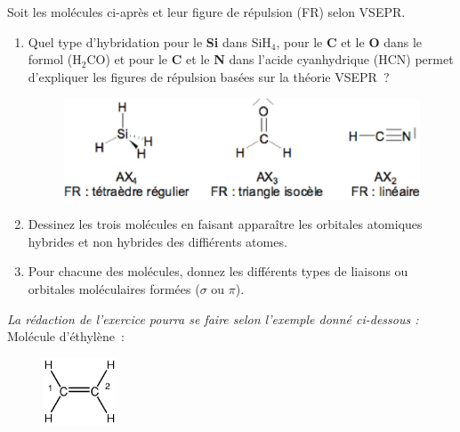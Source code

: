 

Soit les mol\'ecules ci-apr\`es et leur figure de r\'epulsion (FR) selon VSEPR.

\begin{enumerate}[\bf 1)]
\item Quel type d'hybridation pour le \textbf{Si} dans SiH$_4$, pour le \textbf{C} et le \textbf{O} dans le formol 
(H$_2$CO) et pour le \textbf{C} et le \textbf{N} dans l'acide cyanhydrique (HCN) permet d'expliquer les figures de 
r\'epulsion bas\'ees sur la th\'eorie VSEPR~?
\begin{figure}[!h]
\begin{center}
\includegraphics[scale=0.17]{figure/vsepr2.eps}
\end{center}
\end{figure}

\item Dessinez les trois mol\'ecules en faisant appara\^itre les orbitales atomiques hybrides et non hybrides des 
diffi\'erents atomes.
\item Pour chacune des mol\'ecules, donnez les diff\'erents types de liaisons ou 
orbitales mol\'eculaires form\'ees ($\sigma$ ou $\pi$).
\end{enumerate}

\textit{La r\'edaction de l'exercice pourra se faire selon l'exemple donn\'e ci-dessous :}\\
Mol\'ecule d'\'ethyl\`ene~:

%
\begin{figure}[!h]
\begin{center}
\includegraphics[height=2.0cm]{figure/vsepr3.eps}
\end{center}
\end{figure}
%

